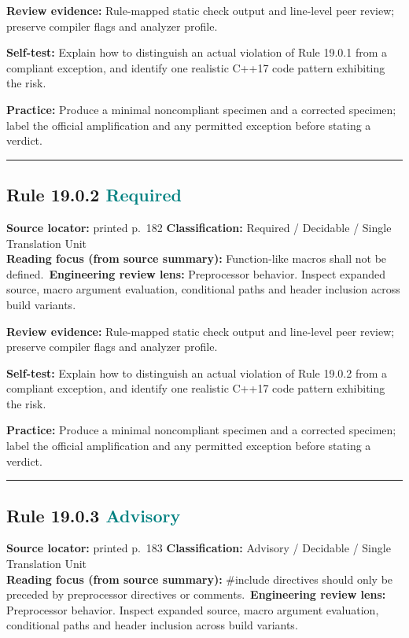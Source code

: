 \documentclass[10pt,letterpaper]{article}
\begin{document}
\textbf{Review evidence:} Rule-mapped static check output and line-level peer review; preserve compiler flags and analyzer profile.

\textbf{Self-test:} Explain how to distinguish an actual violation of Rule 19.0.1 from a compliant exception, and identify one realistic C++17 code pattern exhibiting the risk.\par
\textbf{Practice:} Produce a minimal noncompliant specimen and a corrected specimen; label the official amplification and any permitted exception before stating a verdict.
\smallskip\hrule\smallskip
\subsection*{Rule 19.0.2 \enspace \texorpdfstring{\small\textcolor{teal}{Required}}{Required}}
\noindent\textbf{Source locator:} printed p.~182 \quad\textbf{Classification:} Required / Decidable / Single Translation Unit\\
\textbf{Reading focus (from source summary):} Function-like macros shall not be defined.\
\textbf{Engineering review lens:} Preprocessor behavior. Inspect expanded source, macro argument evaluation, conditional paths and header inclusion across build variants.

\textbf{Review evidence:} Rule-mapped static check output and line-level peer review; preserve compiler flags and analyzer profile.

\textbf{Self-test:} Explain how to distinguish an actual violation of Rule 19.0.2 from a compliant exception, and identify one realistic C++17 code pattern exhibiting the risk.\par
\textbf{Practice:} Produce a minimal noncompliant specimen and a corrected specimen; label the official amplification and any permitted exception before stating a verdict.
\smallskip\hrule\smallskip
\subsection*{Rule 19.0.3 \enspace \texorpdfstring{\small\textcolor{teal}{Advisory}}{Advisory}}
\noindent\textbf{Source locator:} printed p.~183 \quad\textbf{Classification:} Advisory / Decidable / Single Translation Unit\\
\textbf{Reading focus (from source summary):} \#include directives should only be preceded by preprocessor directives or comments.\
\textbf{Engineering review lens:} Preprocessor behavior. Inspect expanded source, macro argument evaluation, conditional paths and header inclusion across build variants.
\end{document}
